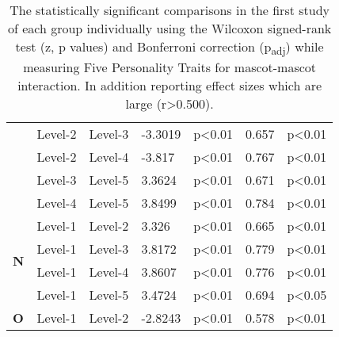 \begin{table}
\begin{center}
\begin{tabular}{ |p{0.5cm}| p{1.5cm}|p{1.5cm}|p{1.3cm}| p{1.6cm}|p{1cm}|p{1.5cm}|  }
            &Level-2 &Level-3 &-3.3019 &p<0.01 &0.657 &p<0.01\\
            &Level-2 &Level-4 &-3.817 &p<0.01 &0.767 &p<0.01\\
            &Level-3 &Level-5 &3.3624 &p<0.01 &0.671 &p<0.01\\
            &Level-4 &Level-5 &3.8499 &p<0.01 &0.784 &p<0.01\\
            \hline
            \hline
            \multirow{4}{*}{\textbf{N}}
            &Level-1 &Level-2 &3.326 &p<0.01 &0.665 &p<0.01\\
            &Level-1 &Level-3 &3.8172 &p<0.01 &0.779 &p<0.01\\
            &Level-1 &Level-4 &3.8607 &p<0.01 &0.776 &p<0.01\\
            &Level-1 &Level-5 &3.4724 &p<0.01 &0.694 &p<0.05\\
            \hline
            \hline
            \multirow{1}{*}{\textbf{O}}
            &Level-1 &Level-2 &-2.8243 &p<0.01 &0.578 &p<0.01\\
            \hline
        \end{tabular}
    \end{center}
    \captionsetup{width=13.5cm}
    \caption{The statistically significant comparisons in the first study of each group individually using the
    Wilcoxon signed-rank test (z, p values) and Bonferroni correction (p\textsubscript{adj}) while measuring Five Personality
    Traits for mascot-mascot interaction.
    In addition reporting effect sizes which are large (r>0.500).}
    \label{table:wilcoxMM1}
\end{table}

